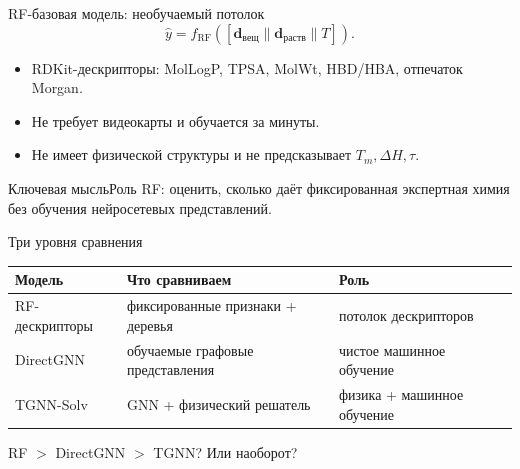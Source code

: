 \documentclass[aspectratio=169,10pt]{beamer}
\newcommand{\keybox}[1]{\begin{block}{Ключевая мысль}#1\end{block}}
\newcommand{\tightitems}{\setlength{\itemsep}{0.25em}}
\begin{document}
\begin{frame}{RF-базовая модель: необучаемый потолок}
  \[
    \hat{y}=f_{\mathrm{RF}}([\mathbf{d}_{\text{вещ}}\|\mathbf{d}_{\text{раств}}\|T]).
  \]
  \begin{itemize}\tightitems
    \item RDKit-дескрипторы: MolLogP, TPSA, MolWt, HBD/HBA, отпечаток Morgan.
    \item Не требует видеокарты и обучается за минуты.
    \item Не имеет физической структуры и не предсказывает $T_m,\Delta H,\tau$.
  \end{itemize}
  \keybox{Роль RF: оценить, сколько даёт фиксированная экспертная химия без обучения нейросетевых представлений.}
\end{frame}

\begin{frame}{Три уровня сравнения}
  \small
  \begin{tabularx}{\textwidth}{lYY}
    \toprule
    \textbf{Модель} & \textbf{Что сравниваем} & \textbf{Роль}\\
    \midrule
    RF-дескрипторы & фиксированные признаки + деревья & потолок дескрипторов\\
    DirectGNN & обучаемые графовые представления & чистое машинное обучение\\
    TGNN-Solv & GNN + физический решатель & физика + машинное обучение\\
    \bottomrule
  \end{tabularx}
  \vspace{0.6em}
  \begin{center}
    \Large\textcolor{TGOrange}{RF $>$ DirectGNN $>$ TGNN? Или наоборот?}
  \end{center}
\end{frame}
\end{document}
